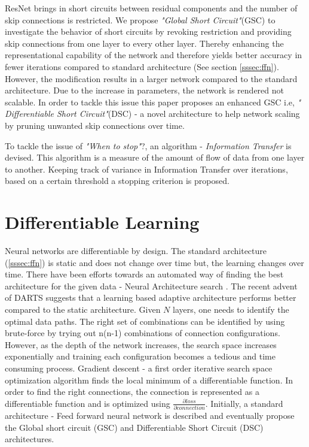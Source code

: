 \documentclass{article}
\begin{document}
ResNet brings in short circuits between residual components and the number of skip connections is restricted. We propose \emph{"Global Short Circuit"}(GSC) to investigate the behavior of short circuits by revoking restriction and providing skip connections from one layer to every other layer. Thereby enhancing the representational capability of the network and therefore yields better accuracy in fewer iterations compared to standard architecture (See section \ref{sssec:ffn}). However, the modification results in a larger network compared to the standard architecture. Due to the increase in parameters, the network is rendered not scalable. In order to tackle this issue this paper proposes an enhanced GSC i.e, \emph{" Differentiable Short Circuit"}(DSC) - a novel architecture to help network scaling by pruning unwanted skip connections over time.

To tackle the issue of \emph{"When to stop"}?, an algorithm - \emph{Information Transfer} is devised. This algorithm is a measure of the amount of flow of data from one layer to another. Keeping track of variance in Information Transfer over iterations, based on a certain threshold a stopping criterion is proposed.

\section{Differentiable Learning}
\label{sec:headings}

Neural networks are differentiable by design. The standard architecture (\ref{sssec:ffn}) is static and does not change over time but, the learning changes over time. There have been efforts towards an automated way of finding the best architecture for the given data - Neural Architecture search \cite{Zoph2016NeuralAS}. The recent advent of DARTS \cite{Liu2019DARTSDA} suggests that a learning based adaptive architecture performs better compared to the static architecture. Given $N$ layers, one needs to identify the optimal data paths. The right set of combinations can be identified by using brute-force by trying out n(n-1) combinations of connection configurations. However, as the depth of the network increases, the search space increases exponentially and training each configuration becomes a tedious and time consuming process. Gradient descent \cite{ruder2016overview} - a first order iterative search space optimization algorithm finds the local minimum of a differentiable function. In order to find the right connections, the  connection is represented as a differentiable function and is optimized using $\frac{\partial loss}{\partial connection}$. Initially, a standard architecture - Feed forward neural network is described and eventually propose the Global short circuit (GSC) and Differentiable Short Circuit (DSC) architectures.
\end{document}
